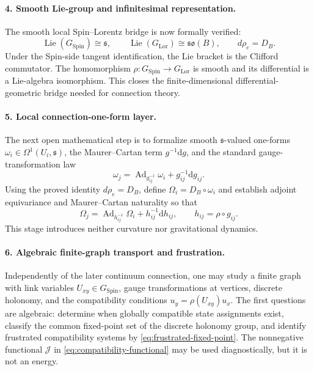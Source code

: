 \documentclass[11pt,a4paper]{article}
\theoremstyle{remark}
\newcommand{\SpinG}{G_{\mathrm{Spin}}}
\newcommand{\LorG}{G_{\mathrm{Lor}}}
\newcommand{\soB}{\mathfrak{so}(B)}
\newcommand{\dd}{\mathrm d}
\begin{document}
\paragraph{4. Smooth Lie-group and infinitesimal representation.}
The smooth local Spin--Lorentz bridge is now formally verified:
\begin{equation}
  \operatorname{Lie}(\SpinG)\cong\mathfrak s,
  \qquad
  \operatorname{Lie}(\LorG)\cong\soB,
  \qquad
  d\rho_e=D_B.
\tag{7.4}
\end{equation}
Under the Spin-side tangent identification, the Lie bracket is the Clifford commutator.  The homomorphism \(\rho:\SpinG\to\LorG\) is smooth and its differential is a Lie-algebra isomorphism.  This closes the finite-dimensional differential-geometric bridge needed for connection theory.

\paragraph{5. Local connection-one-form layer.}
The next open mathematical step is to formalize smooth \(\mathfrak s\)-valued one-forms \(\omega_i\in\Omega^1(U_i,\mathfrak s)\), the Maurer--Cartan term \(g^{-1}\dd g\), and the standard gauge-transformation law
\begin{equation}
  \omega_j
  =\operatorname{Ad}_{g_{ij}^{-1}}\omega_i
  +g_{ij}^{-1}\dd g_{ij}.
\tag{7.5}
\end{equation}
Using the proved identity \(d\rho_e=D_B\), define \(\Omega_i=D_B\circ\omega_i\) and establish adjoint equivariance and Maurer--Cartan naturality so that
\begin{equation}
  \Omega_j
  =\operatorname{Ad}_{h_{ij}^{-1}}\Omega_i
  +h_{ij}^{-1}\dd h_{ij},
  \qquad h_{ij}=\rho\circ g_{ij}.
\tag{7.6}
\end{equation}
This stage introduces neither curvature nor gravitational dynamics.

\paragraph{6. Algebraic finite-graph transport and frustration.}
Independently of the later continuum connection, one may study a finite graph with link variables \(U_{xy}\in\SpinG\), gauge transformations at vertices, discrete holonomy, and the compatibility conditions \(u_y=\rho(U_{xy})u_x\).  The first questions are algebraic: determine when globally compatible state assignments exist, classify the common fixed-point set of the discrete holonomy group, and identify frustrated compatibility systems by \eqref{eq:frustrated-fixed-point}.  The nonnegative functional \(\mathcal J\) in \eqref{eq:compatibility-functional} may be used diagnostically, but it is not an energy.
\end{document}
